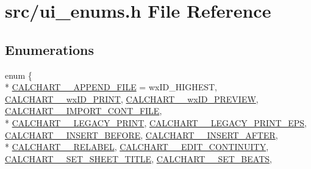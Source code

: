 \hypertarget{a00250}{\section{src/ui\-\_\-enums.h File Reference}
\label{a00250}
}
\subsection*{Enumerations}
\begin{DoxyCompactItemize}
\item 
enum \{ \\*
\hyperlink{a00250_abc5c98fcc1211af2b80116dd6e0a035da6b8e43a934d14064993589f23d0c70d5}{C\-A\-L\-C\-H\-A\-R\-T\-\_\-\-\_\-\-A\-P\-P\-E\-N\-D\-\_\-\-F\-I\-L\-E} = wx\-I\-D\-\_\-\-H\-I\-G\-H\-E\-S\-T, 
\hyperlink{a00250_abc5c98fcc1211af2b80116dd6e0a035da102d5e43fce942b8879362a7b99017c7}{C\-A\-L\-C\-H\-A\-R\-T\-\_\-\-\_\-wx\-I\-D\-\_\-\-P\-R\-I\-N\-T}, 
\hyperlink{a00250_abc5c98fcc1211af2b80116dd6e0a035dadc5926c53d00e7c6d2a644bbbff17531}{C\-A\-L\-C\-H\-A\-R\-T\-\_\-\-\_\-wx\-I\-D\-\_\-\-P\-R\-E\-V\-I\-E\-W}, 
\hyperlink{a00250_abc5c98fcc1211af2b80116dd6e0a035da2e4b3844d84d2ea8631d16acf8c3876b}{C\-A\-L\-C\-H\-A\-R\-T\-\_\-\-\_\-\-I\-M\-P\-O\-R\-T\-\_\-\-C\-O\-N\-T\-\_\-\-F\-I\-L\-E}, 
\\*
\hyperlink{a00250_abc5c98fcc1211af2b80116dd6e0a035dad0a841bc0c2b8247502dc3787ce22d57}{C\-A\-L\-C\-H\-A\-R\-T\-\_\-\-\_\-\-L\-E\-G\-A\-C\-Y\-\_\-\-P\-R\-I\-N\-T}, 
\hyperlink{a00250_abc5c98fcc1211af2b80116dd6e0a035dad085b26f66fbd0c30af0bfca6b021067}{C\-A\-L\-C\-H\-A\-R\-T\-\_\-\-\_\-\-L\-E\-G\-A\-C\-Y\-\_\-\-P\-R\-I\-N\-T\-\_\-\-E\-P\-S}, 
\hyperlink{a00250_abc5c98fcc1211af2b80116dd6e0a035da344eab3b73c6713a73dc426ea71e1d65}{C\-A\-L\-C\-H\-A\-R\-T\-\_\-\-\_\-\-I\-N\-S\-E\-R\-T\-\_\-\-B\-E\-F\-O\-R\-E}, 
\hyperlink{a00250_abc5c98fcc1211af2b80116dd6e0a035da1fe85a670e7f4dc2e7a1530afaeddd01}{C\-A\-L\-C\-H\-A\-R\-T\-\_\-\-\_\-\-I\-N\-S\-E\-R\-T\-\_\-\-A\-F\-T\-E\-R}, 
\\*
\hyperlink{a00250_abc5c98fcc1211af2b80116dd6e0a035dad19e505d3753b360d874e186efb45510}{C\-A\-L\-C\-H\-A\-R\-T\-\_\-\-\_\-\-R\-E\-L\-A\-B\-E\-L}, 
\hyperlink{a00250_abc5c98fcc1211af2b80116dd6e0a035da17076bba1cf650966f4837fe8c43c3f8}{C\-A\-L\-C\-H\-A\-R\-T\-\_\-\-\_\-\-E\-D\-I\-T\-\_\-\-C\-O\-N\-T\-I\-N\-U\-I\-T\-Y}, 
\hyperlink{a00250_abc5c98fcc1211af2b80116dd6e0a035dab0b9852fb55dc8346295130f3ebd0e0a}{C\-A\-L\-C\-H\-A\-R\-T\-\_\-\-\_\-\-S\-E\-T\-\_\-\-S\-H\-E\-E\-T\-\_\-\-T\-I\-T\-L\-E}, 
\hyperlink{a00250_abc5c98fcc1211af2b80116dd6e0a035da084bdc1f422b9a8ee9638b0d11e4aebc}{C\-A\-L\-C\-H\-A\-R\-T\-\_\-\-\_\-\-S\-E\-T\-\_\-\-B\-E\-A\-T\-S}, 

\end{DoxyCompactItemize}

